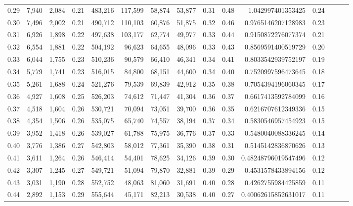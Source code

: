\begin{tabular}{rrrrrrrrrrrrrrr}
0.29 &   7,940 &  2,084 &  0.21 &  483,216 &  117,599 &   58,874 &   53,877 &  0.31 &  0.48 &     1.042997401353425 &      0.24 \\
0.30 &   7,496 &  2,002 &  0.21 &  490,712 &  110,103 &   60,876 &   51,875 &  0.32 &  0.46 &    0.9765146207128983 &      0.23 \\
0.31 &   6,926 &  1,898 &  0.22 &  497,638 &  103,177 &   62,774 &   49,977 &  0.33 &  0.44 &    0.9150872276077374 &      0.21 \\
0.32 &   6,554 &  1,881 &  0.22 &  504,192 &   96,623 &   64,655 &   48,096 &  0.33 &  0.43 &    0.8569591400519729 &      0.20 \\
0.33 &   6,044 &  1,755 &  0.23 &  510,236 &   90,579 &   66,410 &   46,341 &  0.34 &  0.41 &    0.8033542939752197 &      0.19 \\
0.34 &   5,779 &  1,741 &  0.23 &  516,015 &   84,800 &   68,151 &   44,600 &  0.34 &  0.40 &    0.7520997596473645 &      0.18 \\
0.35 &   5,261 &  1,688 &  0.24 &  521,276 &   79,539 &   69,839 &   42,912 &  0.35 &  0.38 &    0.7054394196060345 &      0.17 \\
0.36 &   4,927 &  1,608 &  0.25 &  526,203 &   74,612 &   71,447 &   41,304 &  0.36 &  0.37 &    0.6617413592784099 &      0.16 \\
0.37 &   4,518 &  1,604 &  0.26 &  530,721 &   70,094 &   73,051 &   39,700 &  0.36 &  0.35 &    0.6216707612349336 &      0.15 \\
0.38 &   4,354 &  1,506 &  0.26 &  535,075 &   65,740 &   74,557 &   38,194 &  0.37 &  0.34 &    0.5830546957454923 &      0.15 \\
0.39 &   3,952 &  1,418 &  0.26 &  539,027 &   61,788 &   75,975 &   36,776 &  0.37 &  0.33 &    0.5480040088336245 &      0.14 \\
0.40 &   3,776 &  1,386 &  0.27 &  542,803 &   58,012 &   77,361 &   35,390 &  0.38 &  0.31 &    0.5145142836870626 &      0.13 \\
0.41 &   3,611 &  1,264 &  0.26 &  546,414 &   54,401 &   78,625 &   34,126 &  0.39 &  0.30 &   0.48248796019547496 &      0.12 \\
0.42 &   3,307 &  1,245 &  0.27 &  549,721 &   51,094 &   79,870 &   32,881 &  0.39 &  0.29 &    0.4531578433894156 &      0.12 \\
0.43 &   3,031 &  1,190 &  0.28 &  552,752 &   48,063 &   81,060 &   31,691 &  0.40 &  0.28 &    0.4262755984425859 &      0.11 \\
0.44 &   2,892 &  1,153 &  0.29 &  555,644 &   45,171 &   82,213 &   30,538 &  0.40 &  0.27 &   0.40062615852631017 &      0.11 \\

\end{tabular}
